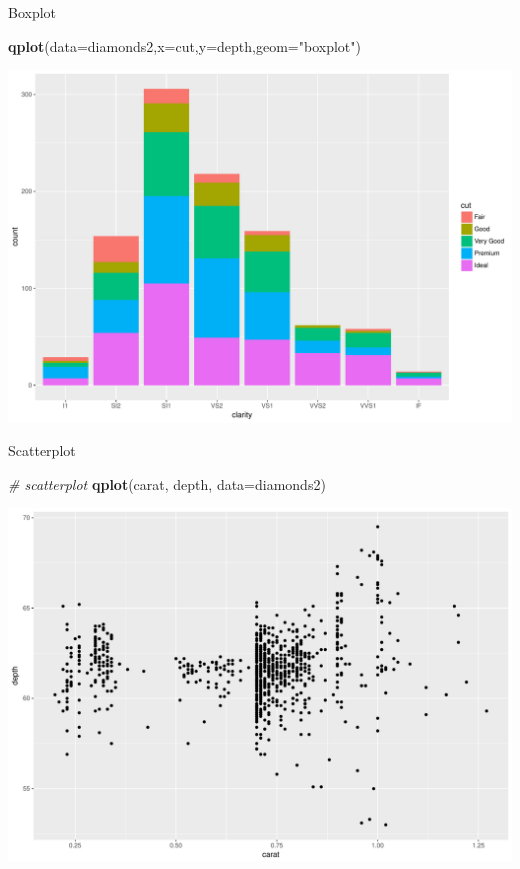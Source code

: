 \documentclass[ignorenonframetext,]{beamer}
\newenvironment{Shaded}{}{}
\newcommand{\KeywordTok}[1]{\textcolor[rgb]{0.00,0.44,0.13}{\textbf{{#1}}}}
\newcommand{\DataTypeTok}[1]{\textcolor[rgb]{0.56,0.13,0.00}{{#1}}}
\newcommand{\StringTok}[1]{\textcolor[rgb]{0.25,0.44,0.63}{{#1}}}
\newcommand{\CommentTok}[1]{\textcolor[rgb]{0.38,0.63,0.69}{\textit{{#1}}}}
\newcommand{\NormalTok}[1]{{#1}}
\begin{document}
\begin{frame}[fragile]{Boxplot}

\begin{Shaded}
\begin{Highlighting}[]
\KeywordTok{qplot}\NormalTok{(}\DataTypeTok{data=}\NormalTok{diamonds2,}\DataTypeTok{x=}\NormalTok{cut,}\DataTypeTok{y=}\NormalTok{depth,}\DataTypeTok{geom=}\StringTok{"boxplot"}\NormalTok{)}
\end{Highlighting}
\end{Shaded}

\includegraphics{R_intern_files/figure-beamer/unnamed-chunk-245-1.pdf}

\end{frame}

\begin{frame}[fragile]{Scatterplot}

\begin{Shaded}
\begin{Highlighting}[]
\CommentTok{# scatterplot}
\KeywordTok{qplot}\NormalTok{(carat, depth, }\DataTypeTok{data=}\NormalTok{diamonds2)}
\end{Highlighting}
\end{Shaded}

\includegraphics{R_intern_files/figure-beamer/unnamed-chunk-246-1.pdf}

\end{frame}
\end{document}
